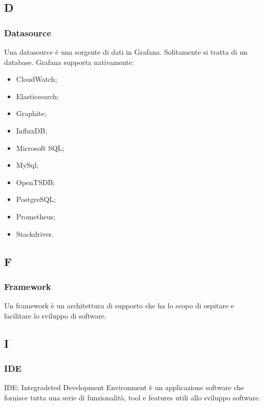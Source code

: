 \appendix
{}
\subsection*{D}

\subsubsection*{Datasource}
\label{sec:datasource} 
Una datasource è una sorgente di dati in Grafana. Solitamente si tratta di un database. Grafana supporta nativamente:
	\begin{itemize}
	\item CloudWatch;
	\item Elasticsearch;
	\item Graphite;
	\item InfluxDB;
	\item Microsoft SQL;
	\item MySql;
	\item OpenTSDB;
	\item PostgreSQL;
	\item Prometheus;
	\item Stackdriver.
	\end{itemize}


\subsection*{F}

	\subsubsection*{Framework} 
	\label{sec:ide}
Un framework è un architettura di supporto che ha lo scopo di ospitare e facilitare lo sviluppo di software.


\subsection*{I}

	\subsubsection*{IDE} 
	\label{sec:ide}
IDE: Integradeted Development Environment è un applicazione software che fornisce tutta una serie di funzionalità, tool e features utili allo sviluppo software.


